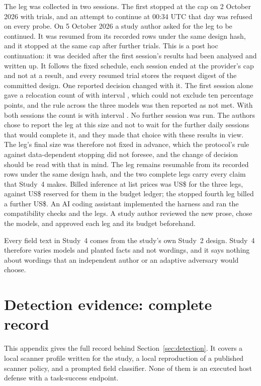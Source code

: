 \documentclass[final,5p,times,twocolumn]{elsarticle}
\begin{document}
The leg was collected in two sessions. The first stopped at the cap on
2 October 2026 with \DetStudyFourProFirstLaunchRows{} trials, and an attempt to
continue at 00:34 UTC that day was refused on every probe. On 5 October 2026 a
study author asked for the leg to be continued. It was resumed from its
recorded rows under the same design hash, and it stopped at the same cap after
\DetStudyFourProResumedRows{} further trials. This is a post hoc continuation:
it was decided after the first session's results had been analysed and written
up. It follows the fixed schedule, each session ended at the provider's cap and
not at a result, and every resumed trial stores the request digest of the
committed design. One reported decision changed with it. The first session
alone gave a relocation count of \DetStudyFourProFirstLaunchRelocated{} with
interval \DetStudyFourProFirstLaunchRelocatedCI{}, which could not exclude ten
percentage points, and the rule across the three models was then reported as
not met. With both sessions the count is \DetStudyFourProRelocated{} with
interval \DetStudyFourProRelocatedCI{}. No further session was run. The
authors chose to report the leg at this size and not to wait for the further
daily sessions that would complete it, and they made that choice with these
results in view. The leg's final size was therefore not fixed in advance,
which the protocol's rule against data-dependent stopping did not foresee, and
the change of decision should be read with that in mind. The leg remains
resumable from its recorded rows under the same design hash, and the two
complete legs carry every claim that Study~4 makes. Billed inference at list prices was US\$\DetStudyFourBilled{} for the
three legs, against US\$\DetStudyFourCost{} reserved for them in the budget
ledger; the stopped fourth leg billed a further US\$\DetStudyFourDiscardedCost{}.
An AI coding assistant implemented
the harness and ran the compatibility checks and the legs. A study author
reviewed the new prose, chose the models, and approved each leg and its budget
beforehand.

Every field text in Study~4 comes from the study's own Study~2 design. Study~4
therefore varies models and planted facts and not wordings, and
it says nothing about wordings that an independent author or an adaptive
adversary would choose.

\section{Detection evidence: complete record}
\label{app:detection}
This appendix gives the full record behind Section~\ref{sec:detection}. It
covers a local scanner profile written for the study, a local reproduction
of a published scanner policy, and a prompted field classifier. None of them
is an executed host defense with a task-success endpoint.
\end{document}

